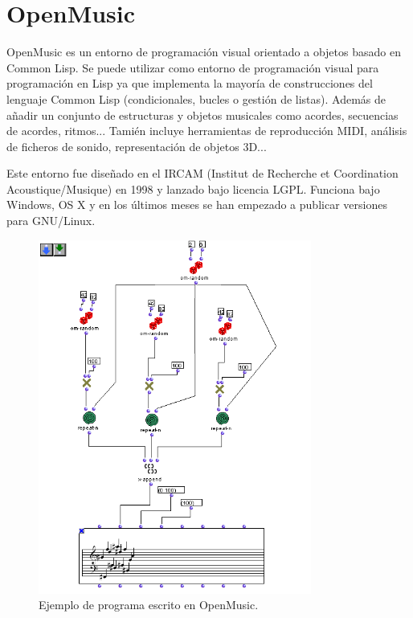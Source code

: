 \documentclass[a4paper,openany,oneside,12pt]{book}
\begin{document}
\section{OpenMusic}

OpenMusic \cite{openmusic} es un entorno de programación visual orientado a objetos basado en Common Lisp. Se puede utilizar como entorno de programación visual para programación en Lisp ya que implementa la mayoría de construcciones del lenguaje Common Lisp (condicionales, bucles o gestión de listas). Además de añadir un conjunto de estructuras y objetos musicales como acordes, secuencias de acordes, ritmos... Tamién incluye herramientas de reproducción MIDI, análisis de ficheros de sonido, representación de objetos 3D...

Este entorno fue diseñado en el IRCAM (Institut de Recherche et Coordination Acoustique/Musique) en 1998 y lanzado bajo licencia LGPL. Funciona bajo Windows, OS X y en los últimos meses se han empezado a publicar versiones para GNU/Linux.

\begin{figure}
\centering
\includegraphics[width=0.8\textwidth]{img/Om_patch.png} 
\caption{Ejemplo de programa escrito en OpenMusic. \cite{wiki:openmusic}} \label{fig:openmusic}
\end{figure}
\end{document}
